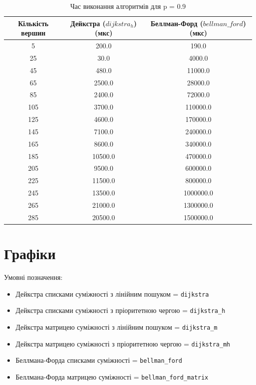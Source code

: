 \documentclass[a4paper,12pt]{article}
\begin{document}
\begin{table}[ht]
    \centering
    \caption{Час виконання алгоритмів для p = 0.9}
    \begin{tabular}{|c|c|c|}
        \hline
        Кількість вершин & Дейкстра ($dijkstra_h$) (мкс) & Беллман-Форд ($bellman\_ford$) (мкс) \\
        \hline
        5   & 200.0   & 190.0 \\
        25  & 30.0    & 4000.0 \\
        45  & 480.0   & 11000.0 \\
        65  & 2500.0  & 28000.0 \\
        85  & 2400.0  & 72000.0 \\
        105 & 3700.0  & 110000.0 \\
        125 & 4600.0  & 170000.0 \\
        145 & 7100.0  & 240000.0 \\
        165 & 8600.0  & 340000.0 \\
        185 & 10500.0 & 470000.0 \\
        205 & 9500.0  & 600000.0 \\
        225 & 11500.0 & 800000.0 \\
        245 & 13500.0 & 1000000.0 \\
        265 & 21000.0 & 1300000.0 \\
        285 & 20500.0 & 1500000.0 \\
        \hline
    \end{tabular}
    \label{tab:data_0.9}
\end{table}

\newpage
\clearpage
\section{Графіки}
Умовні позначення:
\begin{itemize}
    \item Дейкстра списками суміжності з лінійним пошуком = \texttt{dijkstra}
    \item Дейкстра списками суміжності з пріоритетною чергою = \texttt{dijkstra\_h}
    \item Дейкстра матрицею суміжності з лінійним пошуком = \texttt{dijkstra\_m}
    \item Дейкстра матрицею суміжності з пріоритетною чергою = \texttt{dijkstra\_mh}
    \item Беллмана-Форда списками суміжності = \texttt{bellman\_ford}
    \item Беллмана-Форда матрицею суміжності = \texttt{bellman\_ford\_matrix}
\end{itemize}
\end{document}
